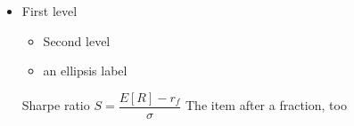 \begin{itemize}
	\item First level
	\begin{itemize}
		\item Second level
		\item[\SMBulletEllipsis] an ellipsis label
	\end{itemize}
	\tallitem Sharpe ratio $S=\dfrac{E[R]-r_f}{\sigma}$
	\tallitem The item after a fraction, too
\end{itemize}
